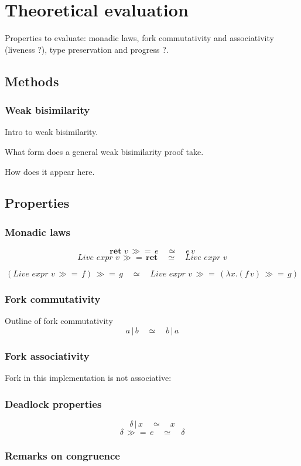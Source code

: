 \documentclass[12pt,twoside,notitlepage]{report}
\begin{document}
\section{Theoretical evaluation}
Properties to evaluate: monadic laws, fork commutativity and associativity (liveness ?), type preservation and progress ?.

\subsection{Methods}
\subsubsection{Weak bisimilarity}
Intro to weak bisimilarity.


What form does a general weak bisimilarity proof take.


How does it appear here.
\subsection{Properties}
\subsubsection{Monadic laws}

\[ \textbf{ret } v\,\gg=\, e\quad \simeq \quad e\,v \]
\[  \textit{Live expr }v\,\gg=\, \textbf{ret}\quad \simeq \quad \textit{Live expr }v \]

\[ (\textit{Live expr }v\, \gg=\, f) \, \gg=\, g \quad \simeq \quad \textit{Live expr }v\, \gg=\, (\lambda x. (f\, v) \, \gg=\, g ) \]

\subsubsection{Fork commutativity}
Outline of fork commutativity
\[ a\,|\,b\quad\simeq\quad b \, | \, a \]
\subsubsection{Fork associativity}
Fork in this implementation is not associative:
\subsubsection{Deadlock properties}
\[ \delta \, |\, x \quad \simeq \quad x \]
\[ \delta \, \gg=\, e\quad \simeq \quad \delta \]
\subsubsection{Remarks on congruence}
\end{document}
